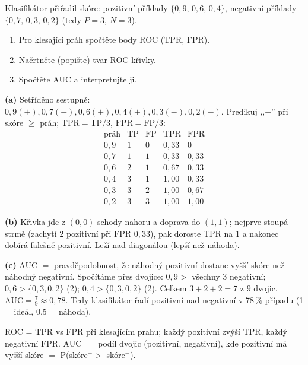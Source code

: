 \begin{zadani}
Klasifikátor přiřadil skóre: pozitivní příklady $\{0{,}9,\,0{,}6,\,0{,}4\}$, negativní příklady $\{0{,}7,\,0{,}3,\,0{,}2\}$ (tedy $P=3$, $N=3$).
\begin{enumerate}[label=(\alph*)]
  \item {} Pro klesající práh spočtěte body ROC (TPR, FPR).
  \item {} Načrtněte (popište) tvar ROC křivky.
  \item {} Spočtěte AUC a interpretujte ji.
\end{enumerate}
\end{zadani}

\begin{reseni}
\textbf{(a)} Setříděno sestupně: $0{,}9(+),0{,}7(-),0{,}6(+),0{,}4(+),0{,}3(-),0{,}2(-)$. Predikuj ,,+'' při skóre $\ge$ práh; $\mathrm{TPR}=\mathrm{TP}/3$, $\mathrm{FPR}=\mathrm{FP}/3$:
\[
\begin{array}{c|cc|cc}
\text{práh} & \mathrm{TP} & \mathrm{FP} & \mathrm{TPR} & \mathrm{FPR}\\\hline
0{,}9 & 1 & 0 & 0{,}33 & 0\\
0{,}7 & 1 & 1 & 0{,}33 & 0{,}33\\
0{,}6 & 2 & 1 & 0{,}67 & 0{,}33\\
0{,}4 & 3 & 1 & 1{,}00 & 0{,}33\\
0{,}3 & 3 & 2 & 1{,}00 & 0{,}67\\
0{,}2 & 3 & 3 & 1{,}00 & 1{,}00
\end{array}
\]

\textbf{(b)} Křivka jde z $(0,0)$ schody nahoru a doprava do $(1,1)$; nejprve stoupá strmě (zachytí 2 pozitivní při FPR $0{,}33$), pak doroste TPR na 1 a nakonec dobírá falešně pozitivní. Leží nad diagonálou (lepší než náhoda).

\textbf{(c)} AUC $=$ pravděpodobnost, že náhodný pozitivní dostane vyšší skóre než náhodný negativní. Spočítáme přes dvojice: $0{,}9>$ všechny 3 negativní; $0{,}6>\{0{,}3,0{,}2\}$ (2); $0{,}4>\{0{,}3,0{,}2\}$ (2). Celkem $3+2+2=7$ z $9$ dvojic. $\text{AUC}=\tfrac{7}{9}\approx0{,}78$. Tedy klasifikátor řadí pozitivní nad negativní v 78\,\% případu (1 = ideál, 0{,}5 = náhoda).
\end{reseni}

\begin{jadro}
ROC = TPR vs FPR při klesajícím prahu; každý pozitivní zvýší TPR, každý negativní FPR. AUC $=$ podíl dvojic (pozitivní, negativní), kde pozitivní má vyšší skóre $=$ P(skóre$^+>$ skóre$^-$).
\end{jadro}

